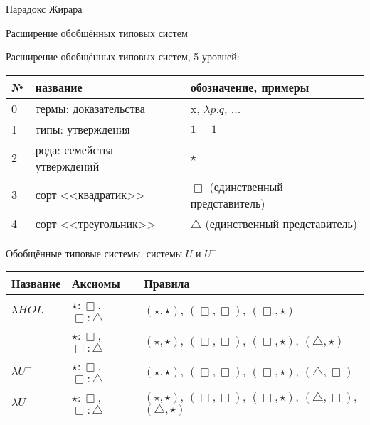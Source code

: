 \documentclass[aspectratio=169,dvipsnames,usenames]{beamer}
\begin{document}
\newtheorem{dfn}{Определение}[section]
\newtheorem{nte}{Замечание}[section]

\newtheorem{axiom}{Аксиома}[section]
\newtheorem{thm}{Теорема}[section]
\newtheorem{lmm}[theorem]{Лемма}
\newtheorem{statement}{Утверждение}[section]
\newtheorem{oun_paragraph}{Пункт}[section]
\newtheorem{cons}{Следствие}[section]
\newtheorem*{exm}{Пример}

\newcommand{\comb}[1]{\operatorname{\mathcal{#1}}}
\newcommand{\func}[1]{\operatorname{#1}}
\newcommand{\reduction}[1]{{\color{OrangeRed}#1}}
\newcommand{\set}[1]{\left\{#1\right\}}

\def\from#1{\par \parbox{0.7\textwidth}{\par \hfill\raggedleft \it #1}} 

\begin{frame}{}
\begin{center}
{\LARGE Парадокс Жирара}
\end{center}
\end{frame}

\begin{frame}{Расширение обобщённых типовых систем}

Расширение обобщённых типовых систем, 5 уровней:

\vspace{1cm}
\begin{tabular}{lll}
№ & название & обозначение, примеры\\\hline
0 & термы: доказательства & x, $\lambda p.q$, ...\\
1 & типы: утверждения & $1=1$ \\
2 & рода: семейства утверждений & $\star$ \\
3 & сорт <<квадратик>> & $\Box$ (единственный представитель) \\
4 & сорт <<треугольник>> & $\triangle$ (единственный представитель)
\end{tabular}

\end{frame}
\begin{frame}{Обобщённые типовые системы, системы $U$ и $U^-$}

\begin{tabular}{lll}
Название & Аксиомы & Правила\\\hline
$\lambda HOL$ & $\star : \Box$, $\Box : \triangle$ & $(\star,\star)$, $(\Box,\Box)$, $(\Box,\star)$ \\
             & $\star : \Box$, $\Box : \triangle$ & $(\star,\star)$, $(\Box,\Box)$, $(\Box,\star)$, $(\triangle,\star)$ \\\hline
$\lambda U^-$ & $\star : \Box$, $\Box : \triangle$ & $(\star,\star)$, $(\Box,\Box)$, $(\Box,\star)$, $(\triangle,\Box)$ \\
$\lambda U$ & $\star : \Box$, $\Box : \triangle$ & $(\star,\star)$, $(\Box,\Box)$, $(\Box,\star)$, $(\triangle,\Box)$, $(\triangle,\star)$ 
\end{tabular}

\end{frame}
\end{document}
